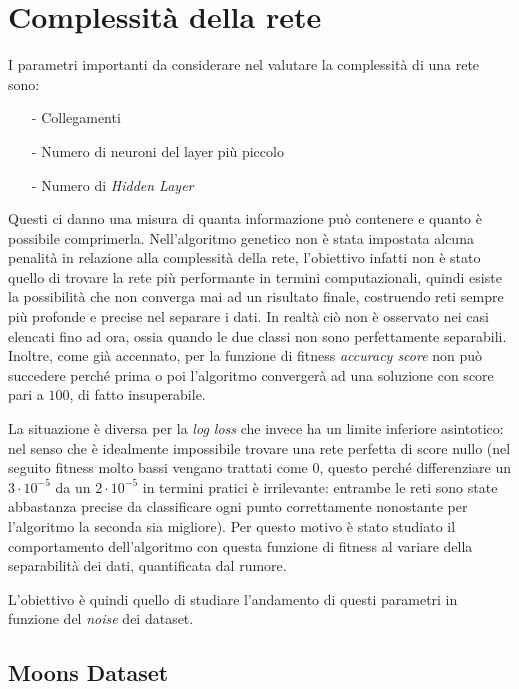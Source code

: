 \documentclass[12pt,a4paper]{report}
\begin{document}
\newpage

\section{Complessità della rete} 

I parametri importanti da considerare nel valutare la complessità di una rete sono:

\begin{enumerate}
 \item[-] Collegamenti
 \item[-] Numero di neuroni del layer più piccolo
 \item[-] Numero di \textit{Hidden Layer}
\end{enumerate}

Questi ci danno una misura di quanta informazione può contenere e quanto è possibile comprimerla.
Nell'algoritmo genetico non è stata impostata alcuna penalità in relazione alla complessità della rete, l'obiettivo infatti non è stato quello di trovare la rete più performante in termini computazionali, quindi esiste la possibilità che non converga mai ad un risultato finale, costruendo reti sempre più profonde e precise nel separare i dati.
In realtà ciò non è osservato nei casi elencati fino ad ora, ossia quando le due classi non sono perfettamente separabili. 
Inoltre, come già accennato, per la funzione di fitness \textit{accuracy score} non può succedere perché prima o poi l'algoritmo convergerà ad una soluzione con score pari a $100$\textdiscount, di fatto insuperabile.

La situazione è diversa per la \textit{log loss} che invece ha un limite inferiore asintotico: nel senso che è idealmente impossibile trovare una rete perfetta di score nullo (nel seguito fitness molto bassi vengano trattati come 0, questo perché differenziare un $3\cdot10^{-5}$ da un $2\cdot10^{-5}$ in termini pratici è irrilevante: entrambe le reti sono state abbastanza precise da classificare ogni punto correttamente nonostante per l'algoritmo la seconda sia migliore).    
Per questo motivo è stato studiato il comportamento dell'algoritmo con questa funzione di fitness al variare della separabilità dei dati, quantificata dal rumore.

L'obiettivo è quindi quello di studiare l'andamento di questi parametri in funzione del \textit{noise} dei dataset.

\newpage

\subsection{Moons Dataset}
\end{document}
